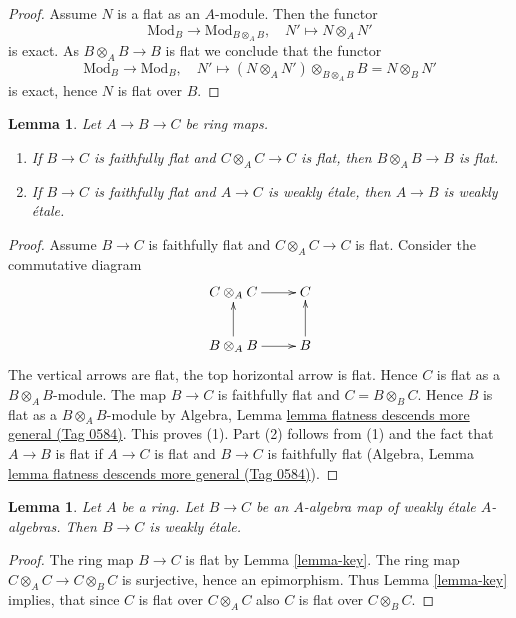 \documentclass{amsart}
\theoremstyle{plain}
\newtheorem{lemma}[subsection]{Lemma}
\theoremstyle{definition}
\theoremstyle{remark}
\numberwithin{equation}{subsection}
\begin{document}
\begin{proof}
Assume $N$ is a flat as an $A$-module.
Then the functor
$$
\text{Mod}_B \longrightarrow \text{Mod}_{B \otimes_A B},\quad
N' \mapsto N \otimes_A N'
$$
is exact. As $B \otimes_A B \to B$ is flat we conclude that the functor
$$
\text{Mod}_B \longrightarrow \text{Mod}_B,\quad
N' \mapsto (N \otimes_A N') \otimes_{B \otimes_A B} B = N \otimes_B N'
$$
is exact, hence $N$ is flat over $B$.
\end{proof}


\begin{lemma}
\label{lemma-go-down}
Let $A \to B \to C$ be ring maps.
\begin{enumerate}
\item If $B \to C$ is faithfully flat and $C \otimes_A C \to C$ is flat,
then $B \otimes_A B \to B$ is flat.
\item If $B \to C$ is faithfully flat and $A \to C$ is weakly \'etale,
then $A \to B$ is weakly \'etale.
\end{enumerate}
\end{lemma}

\begin{proof}
Assume $B \to C$ is faithfully flat and $C \otimes_A C \to C$ is flat.
Consider the commutative diagram
$$
\xymatrix{
C \otimes_A C \ar[r] & C \\
B \otimes_A B \ar[r] \ar[u] & B \ar[u]
}
$$
The vertical arrows are flat, the top horizontal arrow is flat.
Hence $C$ is flat as a $B \otimes_A B$-module. The map $B \to C$ is
faithfully flat and $C = B \otimes_B C$. Hence $B$ is flat as a
$B \otimes_A B$-module by
Algebra, Lemma \href{https://stacks.math.columbia.edu/tag/0584}{lemma flatness descends more general (Tag 0584)}.
This proves (1). Part (2) follows from (1) and the fact that
$A \to B$ is flat if $A \to C$ is flat and $B \to C$ is faithfully flat
(Algebra, Lemma \href{https://stacks.math.columbia.edu/tag/0584}{lemma flatness descends more general (Tag 0584)}).
\end{proof}


\begin{lemma}
\label{lemma-weakly-etale-permanence}
Let $A$ be a ring. Let $B \to C$ be an $A$-algebra map of weakly \'etale
$A$-algebras. Then $B \to C$ is weakly \'etale.
\end{lemma}

\begin{proof}
The ring map $B \to C$ is flat by Lemma \ref{lemma-key}. The ring map
$C \otimes_A C \to C \otimes_B C$ is surjective, hence an epimorphism.
Thus Lemma \ref{lemma-key} implies, that since $C$ is flat over
$C \otimes_A C$ also $C$ is flat over $C \otimes_B C$.
\end{proof}
\end{document}
